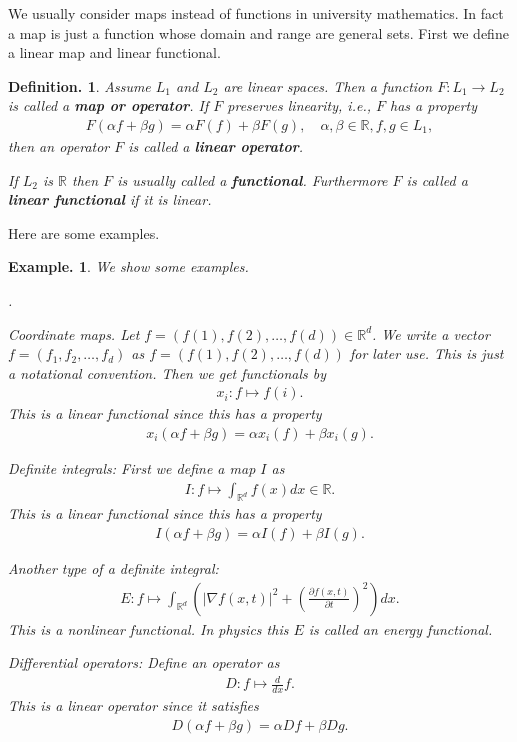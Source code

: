 \documentclass[openany, a4paper, oneside]{jsbook}
\newcounter{enum2}
\renewenvironment{enumerate}{%
\begin{list}%
{%
\arabic{enum2}.\ \,%
}%
{%
\usecounter{enum2}
\setlength{\itemindent}{0pt}%
\setlength{\leftmargin}{15pt}%
\setlength{\rightmargin}{0pt}%
\setlength{\labelsep}{0pt}%
\setlength{\labelwidth}{6pt}%
\setlength{\itemsep}{0pt}%
\setlength{\parsep}{0pt}%
\setlength{\listparindent}{0pt}%
}
}{%
\end{list}%
}
\theoremstyle{break}
\theoremstyle{breakdefn}
\newtheorem{defn}[thm]{Definition.}
\newtheorem{ex}[thm]{Example.}
\newcommand{\abs}[1]{\left|#1\right|}
\newcommand{\rbk}[1]{\left (#1\right)}
\newcommand{\bbR}{\mathbb{R}}
\newcommand{\upbf}[1]{\textup{\textbf{#1}}}
\begin{document}
We usually consider maps instead of functions in university mathematics.
In fact a map is just a function whose domain and range are general sets.
First we define a linear map and linear functional.
\begin{defn}
 Assume $L_1$ and $L_2$ are linear spaces.
 Then a function $F \colon L_1 \to L_2$ is called a \upbf{map or operator}.
 If $F$ preserves linearity, i.e., $F$ has a property
 \begin{align}
  F \rbk{\alpha f + \beta g}
  =
  \alpha F(f) + \beta F(g), \quad \alpha, \beta \in \bbR, f, g \in L_1,
 \end{align}
 then an operator $F$ is called a \upbf{linear operator}.

 If $L_2$ is $\bbR$ then $F$ is usually called a \upbf{functional}.
 Furthermore $F$ is called a \upbf{linear functional} if it is linear.
\end{defn}
Here are some examples.
\begin{ex}
 We show some examples.
\begin{enumerate}
\item Coordinate maps. Let $f = (f(1), f(2), \dots, f(d)) \in \bbR^d$.
    We write a vector $f = (f_1, f_2, \dots, f_d)$ as $f = (f(1), f(2), \dots, f(d))$ for later use.
    This is just a notational convention.
    Then we get functionals by
   \begin{align}
    x_i \colon f \mapsto f(i).
   \end{align}
    This is a linear functional since this has a property
   \begin{align}
    x_i \rbk{\alpha f + \beta g}
    =
    \alpha x_i \rbk{f} + \beta x_i \rbk{g}.
   \end{align}
\item Definite integrals: First we define a map $I$ as
   \begin{align}
     I \colon
     f \mapsto \int_{\bbR^d} f(x) dx \in \bbR.
   \end{align}
    This is a linear functional since this has a property
   \begin{align}
    I \rbk{\alpha f + \beta g}
    =
    \alpha I \rbk{f} + \beta I \rbk{g}.
   \end{align}
\item Another type of a definite integral:
   \begin{align}
    E \colon
    f \mapsto \int_{\bbR^d} \rbk{\abs{\nabla f(x, t)}^2 + \rbk{\frac{\partial f(x, t)}{\partial t}}^2} dx. \label{linear-algebra-and-calculus-4}
   \end{align}
   This is a nonlinear functional.
   In physics this $E$ is called an energy functional.
\item Differential operators: Define an operator as
   \begin{align}
    D \colon f \mapsto \frac{d}{dx} f.
   \end{align}
    This is a \textup{linear operator} since it satisfies
   \begin{align}
    D \rbk{\alpha f + \beta g}
    =
    \alpha Df + \beta Dg.
   \end{align}
\end{enumerate}
\end{ex}
\end{document}
